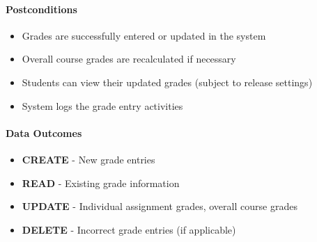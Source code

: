 \paragraph{Postconditions}
\begin{itemize}
    \item Grades are successfully entered or updated in the system
    \item Overall course grades are recalculated if necessary
    \item Students can view their updated grades (subject to release settings)
    \item System logs the grade entry activities
\end{itemize}

\paragraph{Data Outcomes}
\begin{itemize}
    \item \textbf{CREATE} - New grade entries
    \item \textbf{READ} - Existing grade information
    \item \textbf{UPDATE} - Individual assignment grades, overall course grades
    \item \textbf{DELETE} - Incorrect grade entries (if applicable)
\end{itemize}